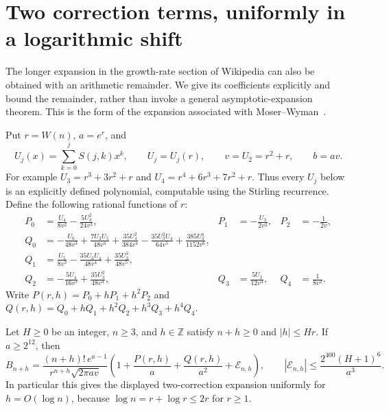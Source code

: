 \section{Two correction terms, uniformly in a logarithmic shift}
\label{sec:corrections}

The longer expansion in the growth-rate section of Wikipedia can also be
obtained with an arithmetic remainder.  We give its coefficients explicitly
and bound the remainder, rather than invoke a general asymptotic-expansion
theorem.  This is the form of the expansion associated with
Moser--Wyman~\cite{moser-wyman}.

Put $r=W(n)$, $a=e^r$, and
\[
 U_j(x)=\sum_{k=0}^jS(j,k)x^k,\qquad
 U_j=U_j(r),\qquad v=U_2=r^2+r,\qquad b=av.
\]
For example $U_3=r^3+3r^2+r$ and
$U_4=r^4+6r^3+7r^2+r$.  Thus every $U_j$ below is an explicitly defined
polynomial, computable using the Stirling recurrence.
Define the following rational functions of $r$:
\begin{align*}
 P_0&=\frac{U_4}{8v^2}-\frac{5U_3^2}{24v^3},&
 P_1&=-\frac{U_3}{2v^2},&
 P_2&=-\frac1{2v},\\
 Q_0&=-\frac{U_6}{48v^3}+
       \frac{7U_3U_5}{48v^4}+\frac{35U_4^2}{384v^4}
       -\frac{35U_3^2U_4}{64v^5}+\frac{385U_3^4}{1152v^6},\\
 Q_1&=\frac{U_5}{8v^3}-\frac{35U_3U_4}{48v^4}
                        +\frac{35U_3^3}{48v^5},\\
 Q_2&=-\frac{5U_4}{16v^3}+\frac{35U_3^2}{48v^4},&
 Q_3&=\frac{5U_3}{12v^3},&
 Q_4&=\frac1{8v^2}.
\end{align*}
Write $P(r,h)=P_0+hP_1+h^2P_2$ and
$Q(r,h)=Q_0+hQ_1+h^2Q_2+h^3Q_3+h^4Q_4$.

\begin{theorem}\label{thm:two-corrections}
Let $H\ge0$ be an integer, $n\ge3$, and $h\in\mathbb Z$ satisfy
$n+h\ge0$ and $|h|\le Hr$.  If $a\ge2^{12}$, then
\begin{equation}\label{eq:two-corrections}
 B_{n+h}=\frac{(n+h)!\,e^{a-1}}{r^{n+h}\sqrt{2\pi av}}
    \left(1+\frac{P(r,h)}a+\frac{Q(r,h)}{a^2}
                        +\mathcal E_{n,h}\right),
 \qquad
 |\mathcal E_{n,h}|\le\frac{2^{400}(H+1)^6}{a^3}.
\end{equation}
In particular this gives the displayed two-correction expansion uniformly for
$h=O(\log n)$, because $\log n=r+\log r\le2r$ for $r\ge1$.
\end{theorem}

